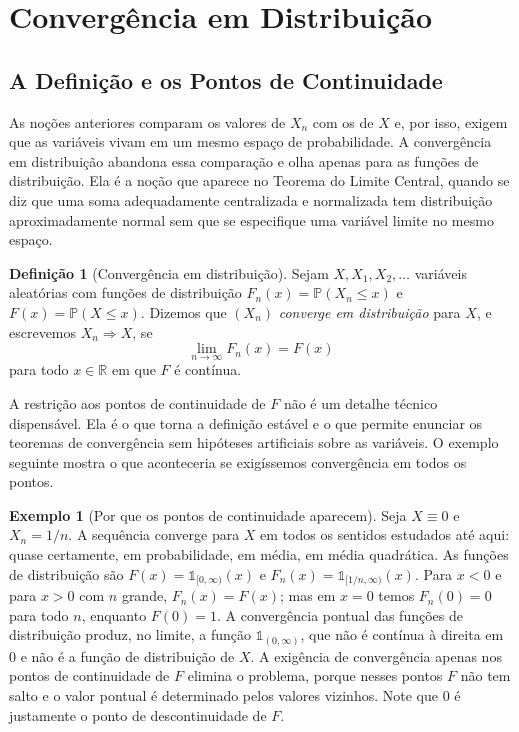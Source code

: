 \documentclass[12pt,portuguese]{article}
\theoremstyle{definition}
\newtheorem{definition}[definition]{Definição}
\newtheorem{example}[example]{Exemplo}
\theoremstyle{plainexercise}
\theoremstyle{starredexercise}
\theoremstyle{definition}
\begin{document}
\section{Convergência em Distribuição}\label{sec:distribuicao}

\subsection{A Definição e os Pontos de Continuidade}\label{subsec:dist-definicao}

As noções anteriores comparam os valores de $X_n$ com os de $X$ e, por isso,
exigem que as variáveis vivam em um mesmo espaço de probabilidade. A
convergência em distribuição abandona essa comparação e olha apenas para as
funções de distribuição. Ela é a noção que aparece no Teorema do Limite
Central, quando se diz que uma soma adequadamente centralizada e normalizada 
tem distribuição aproximadamente
normal sem que se especifique uma variável limite no mesmo espaço.

\begin{definition}[Convergência em distribuição]\label{def:dist}
Sejam $X,X_1,X_2,\ldots$ variáveis aleatórias com funções de distribuição
$F_n(x)=\mathbb{P}(X_n\leqslant x)$ e $F(x)=\mathbb{P}(X\leqslant x)$. Dizemos
que $(X_n)$ \emph{converge em distribuição} para $X$, e escrevemos
$X_n\Rightarrow X$, se
\[
\lim_{n\to\infty}F_n(x)=F(x)
\]
para todo $x\in\mathbb{R}$ em que $F$ é contínua.
\end{definition}

A restrição aos pontos de continuidade de $F$ não é um detalhe técnico
dispensável. Ela é o que torna a definição estável e o que permite enunciar os
teoremas de convergência sem hipóteses artificiais sobre as variáveis. O
exemplo seguinte mostra o que aconteceria se exigíssemos convergência em todos
os pontos.

\begin{example}[Por que os pontos de continuidade aparecem]\label{ex:dist-continuidade}
Seja $X\equiv0$ e $X_n=1/n$. A sequência converge para $X$ em todos os
sentidos estudados até aqui: quase certamente, em probabilidade, em média, em
média quadrática. As funções de distribuição são
$F(x)=\mathds{1}_{[0,\infty)}(x)$ e $F_n(x)=\mathds{1}_{[1/n,\infty)}(x)$.
Para $x<0$ e para $x>0$ com $n$ grande, $F_n(x)=F(x)$; mas em $x=0$ temos
$F_n(0)=0$ para todo $n$, enquanto $F(0)=1$. A convergência pontual das funções
de distribuição produz, no limite, a função $\mathds{1}_{(0,\infty)}$, que não é
contínua à direita em $0$ e não é a função de distribuição de $X$. A exigência
de convergência apenas nos pontos de continuidade de $F$ elimina o problema,
porque nesses pontos $F$ não tem salto e o valor pontual é determinado pelos
valores vizinhos. Note que $0$ é justamente o ponto de descontinuidade de $F$.
\end{example}
\end{document}
